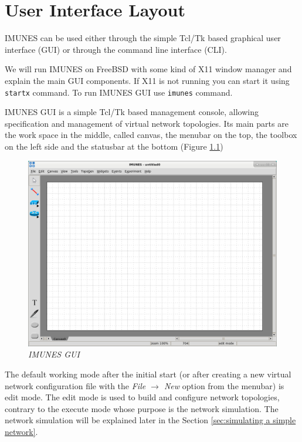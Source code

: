 \chapter{User Interface Layout}
\label{sec:UserInterfaceLayout}
IMUNES can be used either through the simple Tcl/Tk based graphical user
interface (GUI) or through the command line interface (CLI).

We will run IMUNES on FreeBSD with some kind of X11 window manager and explain
the main GUI components. If X11 is not running you can start it using
\texttt{startx} command. To run IMUNES GUI use \texttt{imunes} command.

IMUNES GUI is a simple Tcl/Tk based management console, allowing specification
and management of virtual network topologies. Its main parts are the work space
in the middle, called canvas, the menubar on the top, the toolbox on the left
side and the statusbar at the bottom (Figure \ref{fig:imunes_gui})

\begin{figure}[H]
\centering
\vspace{10pt}
\includegraphics[width=\textwidth]{./images/gui.png}
\caption{\emph{IMUNES GUI}}
\label{fig:imunes_gui}
\end{figure}

The default working mode after the initial start (or after creating a new
virtual network configuration file with the \emph{File $\to$ New} option from
the menubar) is edit mode. The edit mode is used to build and configure network
topologies, contrary to the execute mode whose purpose is the network
simulation. The network simulation will be explained later in the Section
\ref{sec:simulating a simple network}.

